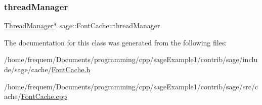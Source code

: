 \subsubsection{\texorpdfstring{threadManager}{threadManager}}
{\footnotesize\ttfamily \mbox{\hyperlink{classsage_1_1ThreadManager}{Thread\+Manager}}$\ast$ sage\+::\+Font\+Cache\+::thread\+Manager\hspace{0.3cm}{\ttfamily [private]}}



The documentation for this class was generated from the following files\+:\begin{DoxyCompactItemize}
\item 
/home/frequem/\+Documents/programming/cpp/sage\+Example1/contrib/sage/include/sage/cache/\mbox{\hyperlink{FontCache_8h}{Font\+Cache.\+h}}\item 
/home/frequem/\+Documents/programming/cpp/sage\+Example1/contrib/sage/src/cache/\mbox{\hyperlink{FontCache_8cpp}{Font\+Cache.\+cpp}}\end{DoxyCompactItemize}
